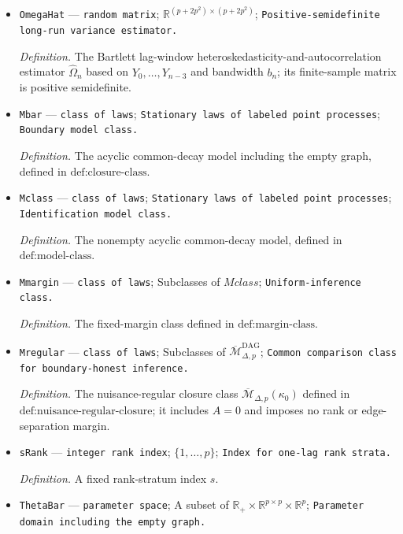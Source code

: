 \documentclass{article}
\begin{document}
\begin{itemize}
  \par\smallskip\noindent\emph{Definition.} \(\widehat r_n=\sum_{s=1}^p\mathbf 1\{\sigma_s(\widehat\Gamma_{1,n})>t_n\}\).
  \item \texttt{OmegaHat} --- \texttt{random matrix}; \(\mathbb R^{(p+2p^2)\times(p+2p^2)}\); \texttt{Positive-\allowbreak{}semidefinite long-\allowbreak{}run variance estimator.}
  \par\smallskip\noindent\emph{Definition.} The Bartlett lag-window heteroskedasticity-and-autocorrelation estimator \(\widehat\Omega_n\) based on \(Y_0,\ldots,Y_{n-3}\) and bandwidth \(b_n\); its finite-sample matrix is positive semidefinite.
  \item \texttt{Mbar} --- \texttt{class of laws}; \texttt{Stationary laws of labeled point processes}; \texttt{Boundary model class.}
  \par\smallskip\noindent\emph{Definition.} The acyclic common-decay model including the empty graph, defined in \(\text{def:closure-class}\).
  \item \texttt{Mclass} --- \texttt{class of laws}; \texttt{Stationary laws of labeled point processes}; \texttt{Identification model class.}
  \par\smallskip\noindent\emph{Definition.} The nonempty acyclic common-decay model, defined in \(\text{def:model-class}\).
  \item \texttt{Mmargin} --- \texttt{class of laws}; Subclasses of \(Mclass\); \texttt{Uniform-\allowbreak{}inference class.}
  \par\smallskip\noindent\emph{Definition.} The fixed-margin class defined in \(\text{def:margin-class}\).
  \item \texttt{Mregular} --- \texttt{class of laws}; Subclasses of \(\overline{\mathcal M}_{\Delta,p}^{\mathrm{DAG}}\); \texttt{Common comparison class for boundary-\allowbreak{}honest inference.}
  \par\smallskip\noindent\emph{Definition.} The nuisance-regular closure class \(\overline{\mathcal M}_{\Delta,p}(\kappa_0)\) defined in \(\text{def:nuisance-regular-closure}\); it includes \(A=0\) and imposes no rank or edge-separation margin.
  \item \texttt{sRank} --- \texttt{integer rank index}; \(\{1,\ldots,p\}\); \texttt{Index for one-\allowbreak{}lag rank strata.}
  \par\smallskip\noindent\emph{Definition.} A fixed rank-stratum index \(s\).
  \item \texttt{ThetaBar} --- \texttt{parameter space}; A subset of \(\mathbb R_{+}\times\mathbb R^{p\times p}\times\mathbb R^p\); \texttt{Parameter domain including the empty graph.}

\end{itemize}
\end{document}

